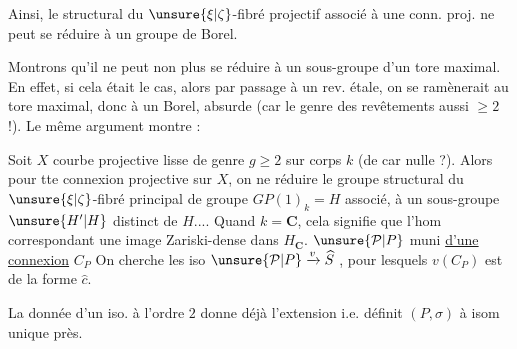 Ainsi, le   structural du $\unsure{\xi|\zeta}$-fibré projectif associé à une conn. proj. ne peut se réduire à un groupe de Borel.

Montrons qu'il ne peut non plus se réduire à un sous-groupe  d'un tore maximal. En effet, si cela était le cas, alors par passage à un rev. étale, on se ramènerait au tore maximal, donc à un Borel, absurde (car le genre des revêtements  aussi $\geq2$ !). Le même argument montre :

\uline{} Soit $X$ courbe projective lisse  de genre $g\geq2$ sur corps $k$ (de car nulle ?). Alors pour tte connexion projective sur $X$, on ne  \deleted{$\unsure{\xi}$} réduire le groupe structural du $\unsure{\xi|\zeta}$-fibré principal de groupe $GP(1)_k=H$ associé, à un sous-groupe  $\unsure{H'|H}$ distinct de $H$....
\margin{!}
Quand $k=\mathbf C$, cela signifie que l'hom correspondant
 une image Zariski-dense dans $H_{\mathbf C}$.
$\unsure{\mathcal P|P}$ muni \uline{d'une connexion} $C_P$
On cherche les iso  $\unsure{\mathcal P|P}\xrightarrow{v}\widehat S$ , pour lesquels $v(C_P)$ est de la forme $\widehat c$.

La donnée d'un iso. à l'ordre $2$ donne déjà l'extension
i.e. définit $(P,\sigma)$ à isom unique près.

